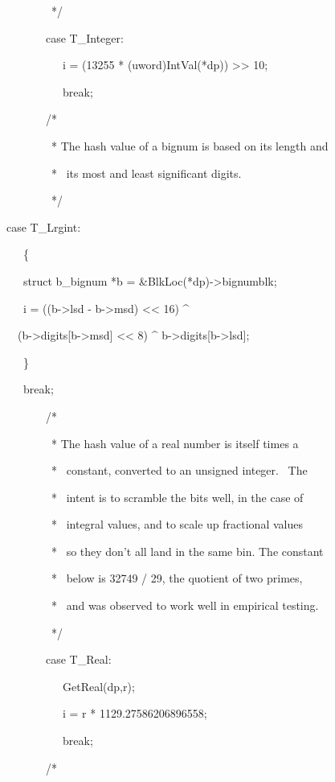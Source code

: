 \ \ \ \ \ \ \ \ \ \ */

\ \ \ \ \ \ \ \ \ case T\_Integer:

\ \ \ \ \ \ \ \ \ \ \ \ i = (13255 * (uword)IntVal(*dp)) {\textgreater}{\textgreater} 10;

\ \ \ \ \ \ \ \ \ \ \ \ break;

\ \ \ \ \ \ \ \ \ /*

\ \ \ \ \ \ \ \ \ \ * The hash value of a bignum is based on its length and 

\ \ \ \ \ \ \ \ \ \ * \ its most and least significant digits.

\ \ \ \ \ \ \ \ \ \ */

\ \  case T\_Lrgint:

\ \  \ \ \ \{

\ \  \ \ \ struct b\_bignum *b = \&BlkLoc(*dp)-{\textgreater}bignumblk;

\ \  \ \ \ i = ((b-{\textgreater}lsd - b-{\textgreater}msd) {\textless}{\textless} 16) \^{}

\ \ \ \ (b-{\textgreater}digits[b-{\textgreater}msd] {\textless}{\textless} 8) \^{}
b-{\textgreater}digits[b-{\textgreater}lsd];

\ \  \ \ \ \}

\ \  \ \ \ break;

\ \ \ \ \ \ \ \ \ /*

\ \ \ \ \ \ \ \ \ \ * The hash value of a real number is itself times a 

\ \ \ \ \ \ \ \ \ \ * \ constant, converted to an unsigned integer. \ The 

\ \ \ \ \ \ \ \ \ \ * \ intent is to scramble the bits well, in the case of 

\ \ \ \ \ \ \ \ \ \ * \ integral values, and to scale up fractional values 

\ \ \ \ \ \ \ \ \ \ * \ so they don't all land in the same bin. The constant

\ \ \ \ \ \ \ \ \ \ * \ below is 32749 / 29, the quotient of two primes,

\ \ \ \ \ \ \ \ \ \ * \ and was observed to work well in empirical testing.

\ \ \ \ \ \ \ \ \ \ */

\ \ \ \ \ \ \ \ \ case T\_Real:

\ \ \ \ \ \ \ \ \ \ \ \ GetReal(dp,r);

\ \ \ \ \ \ \ \ \ \ \ \ i = r * 1129.27586206896558;

\ \ \ \ \ \ \ \ \ \ \ \ break;

\ \ \ \ \ \ \ \ \ /*

